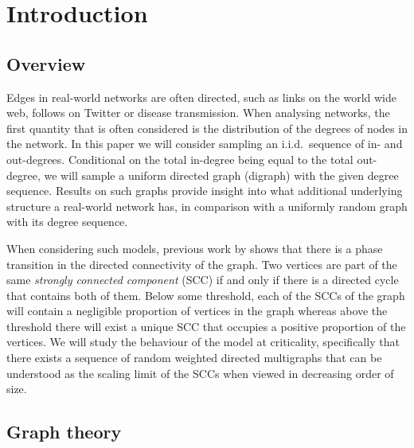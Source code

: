 \section{Introduction}


\subsection{Overview}

Edges in real-world networks are often directed, such as links on the world wide web, follows on Twitter or disease transmission. When analysing networks, the first quantity that is often considered is the distribution of the degrees of nodes in the network.  In this paper we will consider sampling an i.i.d.\ sequence of in- and out-degrees. Conditional on the total in-degree being equal to the total out-degree, we will sample a uniform directed graph (digraph) with the given degree sequence. Results on such graphs provide insight into what additional underlying structure a real-world network has, in comparison with a uniformly random graph with its degree sequence.

When considering such models, previous work by \citet{cooperSizeLargestStrongly2004} shows that there is a phase transition in the directed connectivity of the graph. Two vertices are part of the same \emph{strongly connected component} (SCC) if and only if there is a directed cycle that contains both of them. Below some threshold, each of the SCCs of the graph will contain a negligible proportion of vertices in the graph whereas above the threshold there will exist a unique SCC that occupies a positive proportion of the vertices.  We will study the behaviour of the model at criticality, specifically that there exists a sequence of random weighted directed multigraphs that can be understood as the scaling limit of the SCCs when viewed in decreasing order of size.

\subsection{Graph theory}


